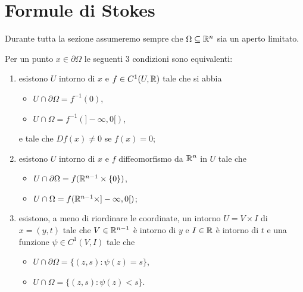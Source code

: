 \section{Formule di Stokes}\label{sezione:FormuleStokes}

Durante tutta la sezione assumeremo sempre che $\Omega\subseteq\mathbb R^n$ sia un aperto limitato.

\begin{theorem}\label{thm:PtRegEquiv}
	Per un punto $x\in \partial \Omega$ le seguenti $3$ condizioni sono equivalenti:
	\begin{enumerate}
		\item esistono $U$ intorno di $x$ e $f\in C^1(U,\mathbb R)$ tale che si abbia
			\begin{itemize}
				\item $U\cap \partial \Omega=f^{-1}(0)$,
				\item $U\cap \Omega=f^{-1}(]-\infty,0[)$,
			\end{itemize}
			e tale che $Df(x)\neq 0$ se $f(x)=0$;\label{PRE:i}
		\item esistono $U$ intorno di $x$ e $f$ diffeomorfismo da $\mathbb R^n$ in $U$ tale che\label{PRE:ii}
			\begin{itemize}
				\item $U\cap \partial \Omega = f(\mathbb R^{n-1}\times\{0\})$,
				\item $U\cap \Omega = f(\mathbb R^{n-1}\times]-\infty,0[)$;
			\end{itemize}
		\item esistono, a meno di riordinare le coordinate, un intorno $U=V\times I$ di $x=(y,t)$ tale che $V\in\mathbb R^{n-1}$ è intorno di $y$
			e $I\in\mathbb R$ è intorno di $t$ e una funzione $\psi\in C^1(V,I)$ tale che
			\begin{itemize}
				\item $U\cap \partial \Omega = \{(z,s):\psi(z)=s\}$,
				\item $U\cap \Omega = \{(z,s):\psi(z)<s\}$.
			\end{itemize}\label{PRE:iii}
	\end{enumerate}
\end{theorem}

